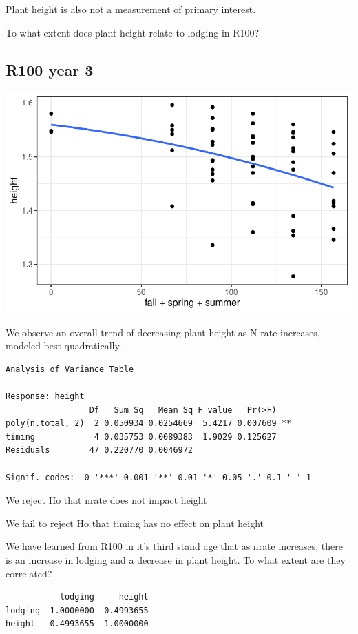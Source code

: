 \documentclass[
  letterpaper,
  DIV=11,
  numbers=noendperiod]{scrartcl}
\begin{document}
Plant height is also not a measurement of primary interest.

To what extent does plant height relate to lodging in R100?

\hypertarget{r100-year-3}{%
\subsection{R100 year 3}\label{r100-year-3}}

\includegraphics{nrate_draft_files/figure-pdf/unnamed-chunk-8-1.pdf}

We observe an overall trend of decreasing plant height as N rate
increases, modeled best quadratically.

\begin{verbatim}
Analysis of Variance Table

Response: height
                 Df   Sum Sq   Mean Sq F value   Pr(>F)   
poly(n.total, 2)  2 0.050934 0.0254669  5.4217 0.007609 **
timing            4 0.035753 0.0089383  1.9029 0.125627   
Residuals        47 0.220770 0.0046972                    
---
Signif. codes:  0 '***' 0.001 '**' 0.01 '*' 0.05 '.' 0.1 ' ' 1
\end{verbatim}

We reject Ho that nrate does not impact height

We fail to reject Ho that timing has no effect on plant height

We have learned from R100 in it's third stand age that as nrate
increases, there is an increase in lodging and a decrease in plant
height. To what extent are they correlated?

\begin{verbatim}
           lodging     height
lodging  1.0000000 -0.4993655
height  -0.4993655  1.0000000
\end{verbatim}
\end{document}
